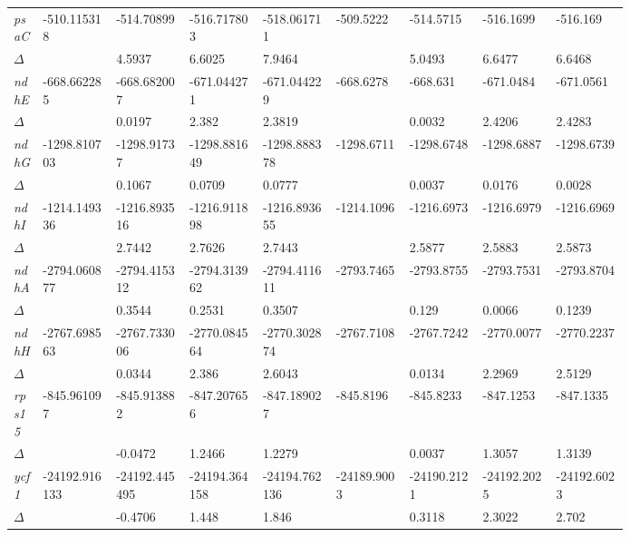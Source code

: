 \documentclass[a4paper]{article}
\begin{document}
\begin{longtable}{p{0.03\linewidth}|p{0.095\linewidth}p{0.095\linewidth}p{0.095\linewidth}p{0.095\linewidth}|p{0.095\linewidth}p{0.095\linewidth}p{0.095\linewidth}p{0.095\linewidth}}
 \rowcolor{black!20} \textit{psaC} & -510.115318 & -514.70899 & -516.717803 & -518.061711 & -509.5222 & -514.5715 & -516.1699 & -516.169\\
 \rowcolor{black!20} $\Delta$ &  & 4.5937 & 6.6025 & 7.9464 &  & 5.0493 & 6.6477 & 6.6468\\
\textit{ndhE} & -668.662285 & -668.682007 & -671.044271 & -671.044229 & -668.6278 & -668.631 & -671.0484 & -671.0561\\
$\Delta$ &  & 0.0197 & 2.382 & 2.3819 &  & 0.0032 & 2.4206 & 2.4283\\
 \rowcolor{black!20} \textit{ndhG} & -1298.810703 & -1298.91737 & -1298.881649 & -1298.888378 & -1298.6711 & -1298.6748 & -1298.6887 & -1298.6739\\
 \rowcolor{black!20} $\Delta$ &  & 0.1067 & 0.0709 & 0.0777 &  & 0.0037 & 0.0176 & 0.0028\\
\textit{ndhI} & -1214.149336 & -1216.893516 & -1216.911898 & -1216.893655 & -1214.1096 & -1216.6973 & -1216.6979 & -1216.6969\\
$\Delta$ &  & 2.7442 & 2.7626 & 2.7443 &  & 2.5877 & 2.5883 & 2.5873\\
 \rowcolor{black!20} \textit{ndhA} & -2794.060877 & -2794.415312 & -2794.313962 & -2794.411611 & -2793.7465 & -2793.8755 & -2793.7531 & -2793.8704\\
 \rowcolor{black!20} $\Delta$ &  & 0.3544 & 0.2531 & 0.3507 &  & 0.129 & 0.0066 & 0.1239\\
\textit{ndhH} & -2767.698563 & -2767.733006 & -2770.084564 & -2770.302874 & -2767.7108 & -2767.7242 & -2770.0077 & -2770.2237\\
$\Delta$ &  & 0.0344 & 2.386 & 2.6043 &  & 0.0134 & 2.2969 & 2.5129\\
 \rowcolor{black!20} \textit{rps15} & -845.961097 & -845.913882 & -847.207656 & -847.189027 & -845.8196 & -845.8233 & -847.1253 & -847.1335\\
 \rowcolor{black!20} $\Delta$ &  & -0.0472 & 1.2466 & 1.2279 &  & 0.0037 & 1.3057 & 1.3139\\
\textit{ycf1} & -24192.916133 & -24192.445495 & -24194.364158 & -24194.762136 & -24189.9003 & -24190.2121 & -24192.2025 & -24192.6023\\
$\Delta$ &  & -0.4706 & 1.448 & 1.846 &  & 0.3118 & 2.3022 & 2.702\\
\end{longtable}
\end{document}
